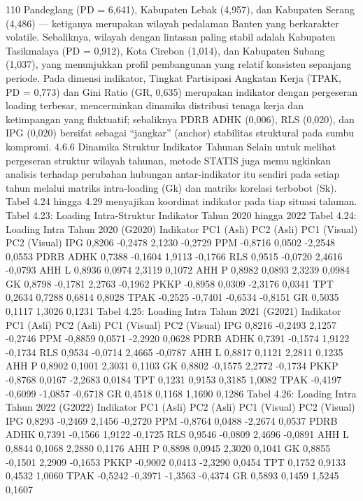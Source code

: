 110
Pandeglang (PD = 6,641), Kabupaten Lebak (4,957), dan Kabupaten Serang (4,486) —
ketiganya merupakan wilayah pedalaman Banten yang berkarakter volatile. Sebaliknya,
wilayah dengan lintasan paling stabil adalah Kabupaten Tasikmalaya (PD = 0,912), Kota
Cirebon (1,014), dan Kabupaten Subang (1,037), yang menunjukkan profil pembangunan
yang relatif konsisten sepanjang periode. Pada dimensi indikator, Tingkat Partisipasi
Angkatan Kerja (TPAK, PD = 0,773) dan Gini Ratio (GR, 0,635) merupakan indikator
dengan pergeseran loading terbesar, mencerminkan dinamika distribusi tenaga kerja dan
ketimpangan yang fluktuatif; sebaliknya PDRB ADHK (0,006), RLS (0,020), dan IPG
(0,020) bersifat sebagai “jangkar” (anchor) stabilitas struktural pada sumbu kompromi.
4.6.6 Dinamika Struktur Indikator Tahunan
Selain untuk melihat pergeseran struktur wilayah tahunan, metode STATIS juga memungkinkan analisis terhadap perubahan hubungan antar-indikator itu sendiri pada setiap
tahun melalui matriks intra-loading (Gk) dan matriks korelasi terbobot (Sk). Tabel 4.24
hingga 4.29 menyajikan koordinat indikator pada tiap situasi tahunan.
Tabel 4.23: Loading Intra-Struktur Indikator Tahun 2020 hingga 2022
Tabel 4.24: Loading Intra
Tahun 2020 (G2020)
Indikator PC1 (Asli) PC2 (Asli) PC1 (Visual) PC2 (Visual)
IPG 0,8206 -0,2478 2,1230 -0,2729
PPM -0,8716 0,0502 -2,2548 0,0553
PDRB ADHK 0,7388 -0,1604 1,9113 -0,1766 RLS 0,9515 -0,0720 2,4616 -0,0793 AHH L 0,8936 0,0974 2,3119 0,1072 AHH P 0,8982 0,0893 2,3239 0,0984 GK 0,8798 -0,1781 2,2763 -0,1962
PKKP -0,8958 0,0309 -2,3176 0,0341 TPT 0,2634 0,7288 0,6814 0,8028 TPAK -0,2525 -0,7401 -0,6534 -0,8151 GR 0,5035 0,1117 1,3026 0,1231
Tabel 4.25: Loading Intra
Tahun 2021 (G2021)
Indikator PC1 (Asli) PC2 (Asli) PC1 (Visual) PC2 (Visual)
IPG 0,8216 -0,2493 2,1257 -0,2746
PPM -0,8859 0,0571 -2,2920 0,0628
PDRB ADHK 0,7391 -0,1574 1,9122 -0,1734 RLS 0,9534 -0,0714 2,4665 -0,0787 AHH L 0,8817 0,1121 2,2811 0,1235 AHH P 0,8902 0,1001 2,3031 0,1103 GK 0,8802 -0,1575 2,2772 -0,1734
PKKP -0,8768 0,0167 -2,2683 0,0184 TPT 0,1231 0,9153 0,3185 1,0082 TPAK -0,4197 -0,6099 -1,0857 -0,6718 GR 0,4518 0,1168 1,1690 0,1286
Tabel 4.26: Loading Intra
Tahun 2022 (G2022)
Indikator PC1 (Asli) PC2 (Asli) PC1 (Visual) PC2 (Visual)
IPG 0,8293 -0,2469 2,1456 -0,2720
PPM -0,8764 0,0488 -2,2674 0,0537
PDRB ADHK 0,7391 -0,1566 1,9122 -0,1725 RLS 0,9546 -0,0809 2,4696 -0,0891 AHH L 0,8844 0,1068 2,2880 0,1176 AHH P 0,8898 0,0945 2,3020 0,1041 GK 0,8855 -0,1501 2,2909 -0,1653
PKKP -0,9002 0,0413 -2,3290 0,0454 TPT 0,1752 0,9133 0,4532 1,0060 TPAK -0,5242 -0,3971 -1,3563 -0,4374 GR 0,5893 0,1459 1,5245 0,1607
